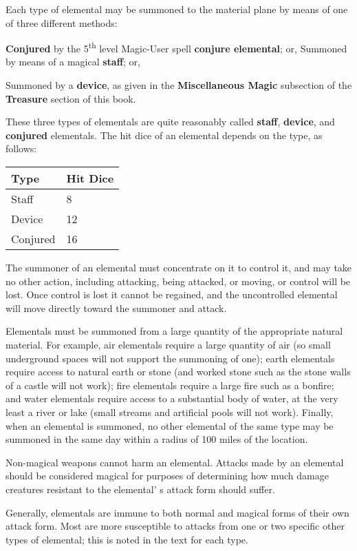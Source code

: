 \documentclass[a4paper,twoside,openany,10pt]{book}
\begin{document}
\begin{multicols}{2}
Each type of elemental may be summoned to the material plane by means of one of three different methods:

\textbf{Conjured} by the 5\textsuperscript{th} level Magic-User spell
\textbf{conjure elemental}; or, Summoned by means of a magical \textbf{staff}; or,

Summoned by a \textbf{device}, as given in the \textbf{Miscellaneous Magic} subsection of the \textbf{Treasure} section of this book.

These three types of elementals are quite reasonably called \textbf{staff}, \textbf{device}, and \textbf{conjured} elementals. The hit dice of an elemental depends on the type, as follows:\medskip

\begin{tabular*}{0.93\linewidth}{@{\extracolsep{\fill}}ll}
\textbf{Type} & \textbf{Hit Dice} \\\hline
Staff & 8 \\\hline
Device & 12 \\\hline
Conjured & 16 \\\hline
\end{tabular*}\medskip

The summoner of an elemental must concentrate on it to control it, and may take no other action, including attacking, being attacked, or moving, or control will be lost. Once control is lost it cannot be regained, and the uncontrolled elemental will move directly toward the summoner and attack.

Elementals must be summoned from a large quantity of the appropriate natural material. For example, air elementals require a large quantity of air (so small underground spaces will not support the summoning of one); earth elementals require access to natural earth or stone (and worked stone such as the stone walls of a castle will not work); fire elementals require a large fire such as a bonfire; and water elementals require access to a substantial body of water, at the very least a river or lake (small streams and artificial pools will not work). Finally, when an elemental is summoned, no other elemental of the same type may be summoned in the same day within a radius of 100 miles of the location.

Non-magical weapons cannot harm an elemental. Attacks made by an elemental should be considered magical for purposes of determining how much damage creatures resistant to the elemental' s attack form should suffer.

Generally, elementals are immune to both normal and magical forms of their own attack form. Most are more susceptible to attacks from one or two specific other types of elemental; this is noted in the text for each type.


\end{multicols}
\end{document}

